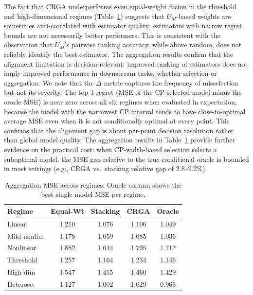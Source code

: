 \documentclass[a4paper,11pt]{article}
\begin{document}
The fact that CRGA underperforms even equal-weight fusion in the threshold and high-dimensional regimes (Table~\ref{tab:aggregation}) suggests that $U_M$-based weights are sometimes anti-correlated with estimator quality: estimators with narrow regret bounds are not necessarily better performers. This is consistent with the observation that $U_M$'s pairwise ranking accuracy, while above random, does not reliably identify the best estimator. The aggregation results confirm that the alignment limitation is decision-relevant: improved ranking of estimators does not imply improved performance in downstream tasks, whether selection or aggregation. We note that the $\Delta$ metric captures the frequency of misselection but not its severity. The top-1 regret (MSE of the CP-selected model minus the oracle MSE) is near zero across all six regimes when evaluated in expectation, because the model with the narrowest CP interval tends to have close-to-optimal average MSE even when it is not conditionally optimal at every point. This confirms that the alignment gap is about per-point decision resolution rather than global model quality. The aggregation results in Table~\ref{tab:aggregation} provide further evidence on the practical cost: when CP-width-based selection selects a suboptimal model, the MSE gap relative to the true conditional oracle is bounded in most settings (e.g., CRGA vs.\ stacking relative gap of 2.8--9.2\%).

\begin{table}[t]
    \centering
    \caption{Aggregation MSE across regimes. Oracle column shows the best single-model MSE per regime.}
    \label{tab:aggregation}
    \begin{tabular}{lcccc}
        \toprule
        Regime & Equal-Wt & Stacking & CRGA & Oracle \\
        \midrule
        Linear       & 1.210 & 1.076 & 1.106 & 1.049 \\
        Mild nonlin.   & 1.178 & 1.059 & 1.085 & 1.036 \\
        Nonlinear    & 1.882 & 1.644 & 1.795 & 1.717 \\
        Threshold    & 1.257 & 1.164 & 1.234 & 1.146 \\
        High-dim     & 1.547 & 1.415 & 1.460 & 1.429 \\
        Heterosc.    & 1.127 & 1.002 & 1.029 & 0.966 \\
        \bottomrule
    \end{tabular}
\end{table}
\end{document}
